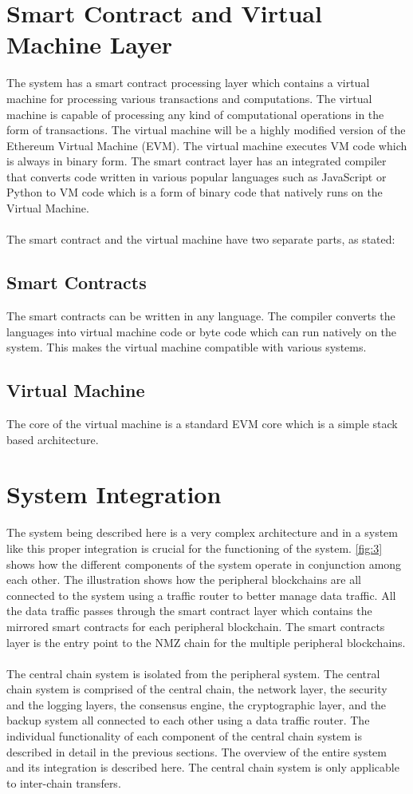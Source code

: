 \documentclass[a4paper,twoside,phd]{BYUPhys}
\begin{document}
\section{Smart Contract and Virtual Machine Layer} 
The system has a smart contract processing layer which contains a virtual machine for processing various transactions and computations. The virtual machine is capable of processing any kind of computational operations in the form of transactions. The virtual machine will be a highly modified version of the Ethereum Virtual Machine (EVM). The virtual machine executes VM code which is always in binary form. The smart contract layer has an integrated compiler that converts code written in various popular languages such as JavaScript or Python to VM code which is a form of binary code that natively runs on the Virtual Machine.
\\
\\
The smart contract and the virtual machine have two separate parts, as stated:
\subsection{Smart Contracts}
The smart contracts can be written in any language. The compiler converts the languages into virtual machine code or byte code which can run natively on the system. This makes the virtual machine compatible with various systems.
\subsection{Virtual Machine}
The core of the virtual machine is a standard EVM core which is a simple stack based architecture. 
\section{System Integration}
The system being described here is a very complex architecture and in a system like this proper integration is crucial for the functioning of the system. \ref{fig:3} shows how the different components of the system operate in conjunction among each other. The illustration shows how the peripheral blockchains are all connected to the system using a traffic router to better manage data traffic. All the data traffic passes through the smart contract layer which contains the mirrored smart contracts for each peripheral blockchain. The smart contracts layer is the entry point to the NMZ chain for the multiple peripheral blockchains.
\\
\\
The central chain system is isolated from the peripheral system. The central chain system is comprised of the central chain, the network layer, the security and the logging layers, the consensus engine, the cryptographic layer, and the backup system all connected to each other using a data traffic router. The individual functionality of each component of the central chain system is described in detail in the previous sections. The overview of the entire system and its integration is described here. The central chain system is only applicable to inter-chain transfers.
\end{document}
